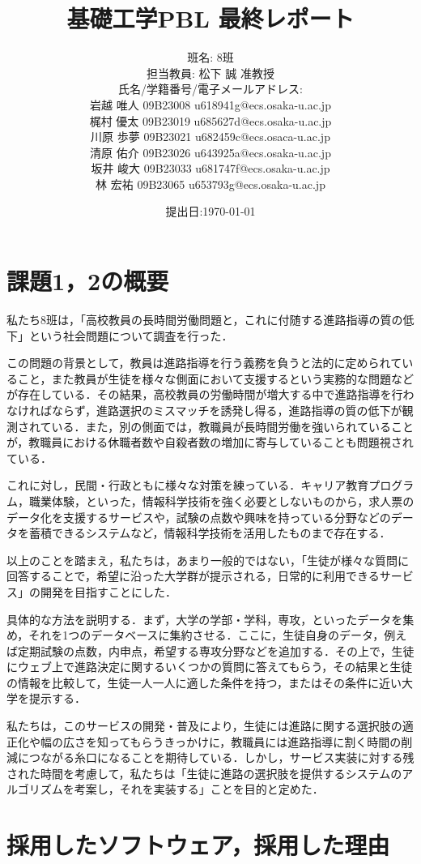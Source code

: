 \documentclass[a4j，titlepage]{jarticle}
\title{基礎工学PBL 最終レポート}
\author{班名: 8班\\
担当教員: 松下 誠 准教授\\
氏名/学籍番号/電子メールアドレス:\\
岩越 唯人 09B23008 u618941g@ecs.osaka-u.ac.jp\\
梶村 優太 09B23019 u685627d@ecs.osaka-u.ac.jp\\
川原 歩夢 09B23021 u682459c@ecs.osaca-u.ac.jp\\
清原 佑介 09B23026 u643925a@ecs.osaka-u.ac.jp\\
坂井 峻大 09B23033 u681747f@ecs.osaka-u.ac.jp\\
林 宏祐 09B23065 u653793g@ecs.osaka-u.ac.jp
}
\date{提出日:\today}
\begin{document}
\maketitle

\section{課題1，2の概要}
私たち8班は，「高校教員の長時間労働問題と，これに付随する進路指導の質の低下」という社会問題について調査を行った．

この問題の背景として，教員は進路指導を行う義務を負うと法的に定められていること，また教員が生徒を様々な側面において支援するという実務的な問題などが存在している．その結果，高校教員の労働時間が増大する中で進路指導を行わなければならず，進路選択のミスマッチを誘発し得る，進路指導の質の低下が観測されている．また，別の側面では，教職員が長時間労働を強いられていることが，教職員における休職者数や自殺者数の増加に寄与していることも問題視されている．

これに対し，民間・行政ともに様々な対策を練っている．キャリア教育プログラム，職業体験，といった，情報科学技術を強く必要としないものから，求人票のデータ化を支援するサービスや，試験の点数や興味を持っている分野などのデータを蓄積できるシステムなど，情報科学技術を活用したものまで存在する．

以上のことを踏まえ，私たちは，あまり一般的ではない，「生徒が様々な質問に回答することで，希望に沿った大学群が提示される，日常的に利用できるサービス」の開発を目指すことにした．

具体的な方法を説明する．まず，大学の学部・学科，専攻，といったデータを集め，それを1つのデータベースに集約させる．ここに，生徒自身のデータ，例えば定期試験の点数，内申点，希望する専攻分野などを追加する．その上で，生徒にウェブ上で進路決定に関するいくつかの質問に答えてもらう，その結果と生徒の情報を比較して，生徒一人一人に適した条件を持つ，またはその条件に近い大学を提示する．

私たちは，このサービスの開発・普及により，生徒には進路に関する選択肢の適正化や幅の広さを知ってもらうきっかけに，教職員には進路指導に割く時間の削減につながる糸口になることを期待している．しかし，サービス実装に対する残された時間を考慮して，私たちは「生徒に進路の選択肢を提供するシステムのアルゴリズムを考案し，それを実装する」ことを目的と定めた．

\section{採用したソフトウェア，採用した理由}
\end{document}

